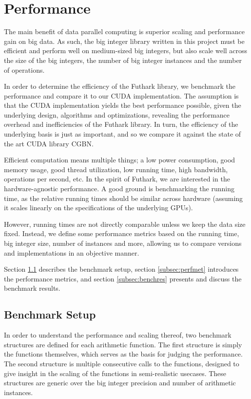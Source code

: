 \section{Performance}
\label{sec:per}

The main benefit of data parallel computing is superior scaling and performance
gain on big data. As such, the big integer library written in this project must
be efficient and perform well on medium-sized big integers, but also scale well
across the size of the big integers, the number of big integer instances and the
number of operations.

In order to determine the efficiency of the Futhark library, we benchmark the
performance and compare it to our CUDA implementation. The assumption is that
the CUDA implementation yields the best performance possible, given the
underlying design, algorithms and optimizations, revealing the performance
overhead and inefficiencies of the Futhark library. In turn, the efficiency of
the underlying basis is just as important, and so we compare it against the
state of the art CUDA library CGBN.

Efficient computation means multiple things; a low power consumption, good
memory usage, good thread utilization, low running time, high bandwidth,
operations per second, etc. In the spirit of Futhark, we are interested in the
hardware-agnostic performance. A good ground is benchmarking the running time,
as the relative running times should be similar across hardware (assuming it
scales linearly on the specifications of the underlying GPUs).

However, running times are not directly comparable unless we keep the data size
fixed. Instead, we define some performance metrics based on the running time,
big integer size, number of instances and more, allowing us to compare versions
and implementations in an objective manner.

Section \ref{subsec:benchset} describes the benchmark setup, section
\ref{subsec:perfmet} introduces the performance metrics, and section
\ref{subsec:benchres} presents and discuss the benchmark results.

\subsection{Benchmark Setup}
\label{subsec:benchset}

In order to understand the performance and scaling thereof, two benchmark
structures are defined for each arithmetic function. The first structure is
simply the functions themselves, which serves as the basis for judging the
performance. The second structure is multiple consecutive calls to the
functions, designed to give insight in the scaling of the functions in
semi-realistic usecases. These structures are generic over the big integer
precision and number of arithmetic instances.

